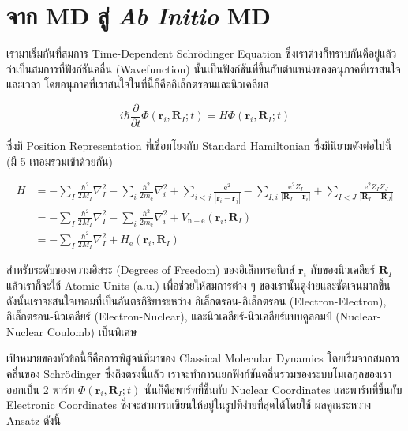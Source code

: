 \section{จาก MD สู่ \textit{Ab Initio} MD}

เรามาเริ่มกันที่สมการ Time-Dependent Schr\"{o}dinger Equation ซึ่งเราต่างก็ทราบกันดีอยู่แล้วว่าเป็นสมการที่ฟังก์ชันคลื่น (Wavefunction)
นั้นเป็นฟังก์ชันที่ขึ้นกับตำแหน่งของอนุภาคที่เราสนใจและเวลา โดยอนุภาคที่เราสนใจในที่นี้ก็คืออิเล็กตรอนและนิวเคลียส

\begin{equation}
  \label{eq:AIMD_TDSE}
  i \hbar \frac{\partial}{\partial t} \Phi\left(\mathbf{r}_i,\mathbf{R}_I ; t\right)
  =
  H \Phi\left(\mathbf{r}_i,\mathbf{R}_I ; t\right)
\end{equation}

\noindent ซึ่งมี Position Representation ที่เชื่อมโยงกับ Standard Hamiltonian ซึ่งมีนิยามดังต่อไปนี้ (มี 5 เทอมรวมเข้าด้วยกัน)

\begin{equation}
  \label{eq:AIMD_Hamiltonian}
  \begin{aligned}
    H
     & = -\sum_I \frac{\hbar^2}{2 M_I} \nabla_I^2
    -\sum_i \frac{\hbar^2}{2 m_{\mathrm{e}}} \nabla_i^2
    +\sum_{i<j} \frac{\mathrm{e}^2}{\left|\mathbf{r}_i-\mathbf{r}_j\right|}
    -\sum_{I, i} \frac{\mathrm{e}^2 Z_I}{\left|\mathbf{R}_I-\mathbf{r}_i\right|}
    +\sum_{I<J} \frac{\mathrm{e}^2 Z_I Z_J}{\left|\mathbf{R}_I-\mathbf{R}_J\right|} \\
     & = -\sum_I \frac{\hbar^2}{2 M_I} \nabla_I^2
    -\sum_i \frac{\hbar^2}{2 m_{\mathrm{e}}} \nabla_i^2
    +V_{\mathrm{n}-\mathrm{e}}\left(\mathbf{r}_i,\mathbf{R}_I\right)                \\
     & = -\sum_I \frac{\hbar^2}{2 M_I} \nabla_I^2
    +H_{\mathrm{e}}\left(\mathbf{r}_i,\mathbf{R}_I\right)
  \end{aligned}
\end{equation}

\noindent สำหรับระดับของความอิสระ (Degrees of Freedom) ของอิเล็กทรอนิกส์ $\mathbf{r}_i$ กับของนิวเคลียร์ $\mathbf{R}_I$
แล้วเราก็จะใช้ Atomic Units (a.u.) เพื่อช่วยให้สมการต่าง ๆ ของเรานั้นดูง่ายและชัดเจนมากขึ้น ดังนั้นเราจะสนใจเทอมที่เป็นอันตรกิริยาระหว่าง
อิเล็กตรอน-อิเล็กตรอน (Electron-Electron), อิเล็กตรอน-นิวเคลียร์ (Electron-Nuclear), และนิวเคลียร์-นิวเคลียร์แบบคูลอมป์
(Nuclear-Nuclear Coulomb) เป็นพิเศษ

เป้าหมายของหัวข้อนี้ก็คือการพิสูจน์ที่มาของ Classical Molecular Dynamics โดยเริ่มจากสมการคลื่นของ Schr\"{o}dinger ซึ่งถึงตรงนี้แล้ว
เราจะทำการแยกฟังก์ชันคลื่นรวมของระบบโมเลกุลของเราออกเป็น 2 พาร์ท $\Phi\left(\mathbf{r}_i,\mathbf{R}_I ; t\right)$
นั่นก็คือพาร์ทที่ขึ้นกับ Nuclear Coordinates และพาร์ทที่ขึ้นกับ Electronic Coordinates ซึ่งจะสามารถเขียนให้อยู่ในรูปที่ง่ายที่สุดได้โดยใช้
ผลคูณระหว่าง Ansatz ดังนี้

